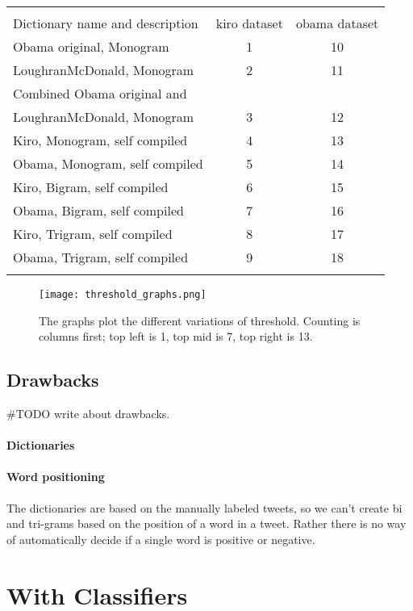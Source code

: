 \begin{tabular}{ l c c }
\hspace{0pt}\\
Dictionary name and description & kiro dataset & obama dataset \\ 
Obama original, Monogram & 1 & 10 \\
LoughranMcDonald, Monogram & 2 & 11 \\
Combined Obama original and \\ LoughranMcDonald, Monogram & 3 & 12 \\
Kiro, Monogram, self compiled & 4 & 13 \\
Obama, Monogram, self compiled & 5 & 14 \\
Kiro, Bigram, self compiled & 6 & 15 \\
Obama, Bigram, self compiled & 7 & 16 \\
Kiro, Trigram, self compiled & 8 & 17 \\
Obama, Trigram, self compiled & 9 & 18 \\

\label{tbl:dictionary_to_threshold}
\end{tabular}

\begin{figure}[htb]
    \centering
    \texttt{[image: threshold\_graphs.png]} 
    \caption{The graphs plot the different variations of threshold. Counting is
columns first; top left is 1, top mid is 7, top right is 13.}
    \label{fig:threshold_graphs}
\end{figure}

\subsection{Drawbacks}
#TODO write about drawbacks.
\paragraph{Dictionaries}
\paragraph{Word positioning}
The dictionaries are based on the manually labeled
tweets, so we can't create bi and tri-grams based on the position of a word in a tweet.
Rather there is no way of automatically decide if a single word is positive or
negative. 

\section{With Classifiers}

